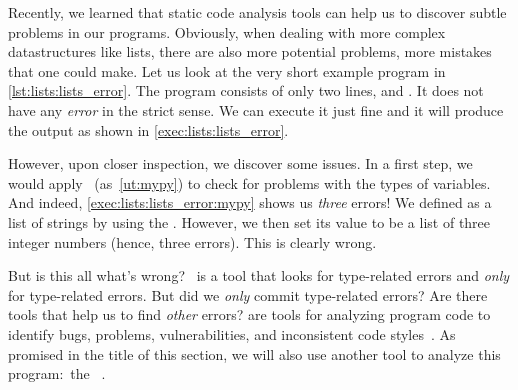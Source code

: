 %
\label{sec:listExampleForErrorsAndRuff}%
%
%
%
%
%
%
%
Recently, we learned that static code analysis tools can help us to discover subtle problems in our programs.
Obviously, when dealing with more complex datastructures like lists, there are also more potential problems, more mistakes that one could make.
Let us look at the very short example program  in \cref{lst:lists:lists_error}.
The program consists of only two lines,  and .
It does not have any \emph{error} in the strict sense.
We can execute it just fine and it will produce the output \textil{[1, 2, 3]} as shown in \cref{exec:lists:lists_error}.

However, upon closer inspection, we discover some issues.
In a first step, we would apply \mypy~(as~\cref{ut:mypy}) to check for problems with the types of variables.
And indeed, \cref{exec:lists:lists_error:mypy} shows us \emph{three} errors!
We defined  as a list of strings by using the  .
However, we then set its value to be a list of three integer numbers (hence, three errors).
This is clearly wrong.

But is this all what's wrong?
\mypy~is a tool that looks for type-related errors and \emph{only} for type-related errors.
But did we \emph{only} commit type-related errors?
Are there tools that help us to find \emph{other} errors?
 are tools for analyzing program code to identify bugs, problems, vulnerabilities, and inconsistent code styles~\cite{J1978LACPC,RJYKK2022CULTDVM}.
As promised in the title of this section, we will also use another tool to analyze this program:~the ~\ruff.

